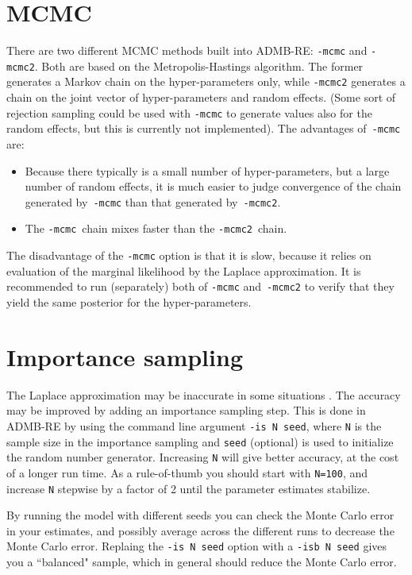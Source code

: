 \documentclass[12pt,letter,reqno]{book}
\begin{document}
\section{MCMC}
There are two different MCMC methods built into ADMB-RE: \texttt{-mcmc} and \texttt{-mcmc2}. Both are based on the
Metropolis-Hastings algorithm. The former generates a Markov chain
on the hyper-parameters only, while \texttt{-mcmc2} generates a chain on the joint vector of
hyper-parameters and random effects. (Some sort of rejection sampling could be used with \texttt{-mcmc} to generate values
also for the random effects, but this is currently not implemented). The advantages of~\texttt{-mcmc} are:
\begin{itemize}
\item Because there typically is a small number of hyper-parameters, but a large number of random effects, it is much
      easier to judge convergence of the chain generated by~\texttt{-mcmc} than that generated by~\texttt{-mcmc2}.
\item The \texttt{-mcmc}~chain mixes faster than the \texttt{-mcmc2}~chain.
\end{itemize}
The disadvantage of the \texttt{-mcmc} option is that it is slow, because it relies on evaluation of the
marginal likelihood by the Laplace approximation. It is recommended to run (separately) both of \texttt{-mcmc} and~\texttt{-mcmc2}
to verify that they yield the same posterior for the hyper-parameters.

\section{Importance sampling}
The Laplace approximation may be inaccurate in some situations . 
The accuracy may be improved by adding an importance sampling step. 
This is done in ADMB-RE by using the command line argument \texttt{-is N seed}, where \texttt{N} 
is the sample size in the importance sampling and \texttt{seed} (optional) is used to 
initialize the random number generator. Increasing \texttt{N} will give better accuracy, at the cost 
of a longer run time. As a rule-of-thumb you should start with \texttt{N=100}, 
and increase \texttt{N} stepwise by a factor of 2 until the parameter estimates stabilize.

By running the model with different seeds you can check the Monte Carlo error in your estimates, and possibly
average across the different runs to decrease the Monte Carlo error.
Replaing the \texttt{-is N seed} option with a \texttt{-isb N seed} gives you a ``balanced"
sample, which in general should reduce the Monte Carlo error.
\end{document}

